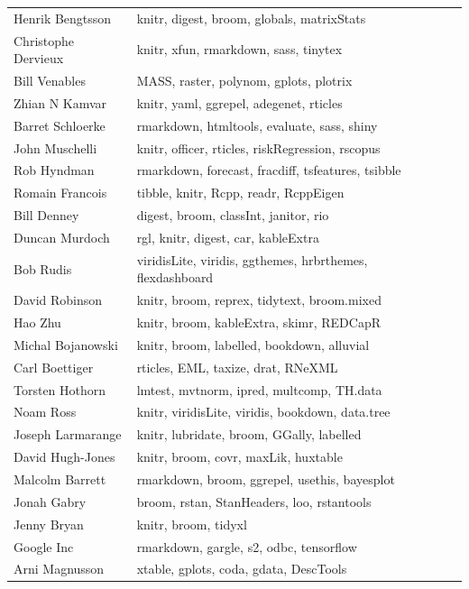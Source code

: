 \begin{table}[h]
\begin{center}
{\begin{tabular}{llll}
 Henrik Bengtsson & knitr, digest, broom, globals, matrixStats \\
 Christophe Dervieux & knitr, xfun, rmarkdown, sass, tinytex \\
 Bill Venables & MASS, raster, polynom, gplots, plotrix \\
 Zhian N Kamvar & knitr, yaml, ggrepel, adegenet, rticles \\
 Barret Schloerke & rmarkdown, htmltools, evaluate, sass, shiny \\
 John Muschelli & knitr, officer, rticles, riskRegression, rscopus \\
 Rob Hyndman & rmarkdown, forecast, fracdiff, tsfeatures, tsibble \\
 Romain Francois & tibble, knitr, Rcpp, readr, RcppEigen \\
 Bill Denney & digest, broom, classInt, janitor, rio \\
 Duncan Murdoch & rgl, knitr, digest, car, kableExtra \\
 Bob Rudis & viridisLite, viridis, ggthemes, hrbrthemes, flexdashboard \\
 David Robinson & knitr, broom, reprex, tidytext, broom.mixed \\
 Hao Zhu & knitr, broom, kableExtra, skimr, REDCapR \\
 Michal Bojanowski & knitr, broom, labelled, bookdown, alluvial \\
 Carl Boettiger & rticles, EML, taxize, drat, RNeXML \\
 Torsten Hothorn & lmtest, mvtnorm, ipred, multcomp, TH.data \\
 Noam Ross & knitr, viridisLite, viridis, bookdown, data.tree \\
 Joseph Larmarange & knitr, lubridate, broom, GGally, labelled \\
 David Hugh-Jones & knitr, broom, covr, maxLik, huxtable \\
 Malcolm Barrett & rmarkdown, broom, ggrepel, usethis, bayesplot \\
 Jonah Gabry & broom, rstan, StanHeaders, loo, rstantools \\
 Jenny Bryan & knitr, broom, tidyxl \\
 Google Inc & rmarkdown, gargle, s2, odbc, tensorflow \\
 Arni Magnusson & xtable, gplots, coda, gdata, DescTools \\
\bottomrule
\end{tabular}}
\end{center}
\end{table}



